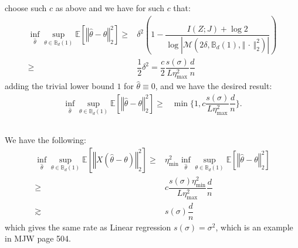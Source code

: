 \documentclass[11pt,a4paper]{ctexart}
\numberwithin{equation}{section}%
\begin{document}
    choose such $ c $ as above and we have for such $ c $ that:
    \begin{align*}
        \mathop{ \inf }\limits_{\hat{\theta }}\mathop{ \sup }\limits_{\theta \in \mathbb{B}_d(1)} \mathbb{E}\left[ \left\Vert \hat{\theta }-\theta  \right\Vert _2^2 \right] \geq & \delta ^2\left(1-\dfrac{ I(Z;J)+\log 2 }{ \log \left\vert \mathcal{M}(2\delta ,\mathbb{B}_d(1), \left\Vert \, \cdot \,  \right\Vert _2^2 ) \right\vert  }  \right)\\
        \geq & \dfrac{ 1 }{ 2 }\delta ^2 = \dfrac{ c }{ 2 }\dfrac{ s(\sigma ) }{ L\eta_{\max}^2 }\dfrac{ d }{ n } 
    \end{align*}
    adding the trivial lower bound $ 1 $ for $ \hat{\theta }\equiv 0 $, and we have the desired result:
    \begin{align*}
        \mathop{ \inf }\limits_{\hat{\theta }}\mathop{ \sup }\limits_{\theta \in \mathbb{B}_d(1)} \mathbb{E}\left[ \left\Vert \hat{\theta }-\theta  \right\Vert _2^2 \right] \geq & \min \big\{ 1, c\dfrac{ s(\sigma ) }{ L\eta_{\max}^2 }\dfrac{ d }{ n }  \big\}.
    \end{align*}


\subsection{}

We have the following:
\begin{align*}
    \mathop{ \inf }\limits_{\hat{\theta }}\mathop{ \sup }\limits_{\theta \in \mathbb{B}_d(1)}\mathbb{E}\left[ \left\Vert X(\hat{\theta }-\theta)  \right\Vert _2^2 \right] \geq & \eta_{\min}^2\mathop{ \inf }\limits_{\hat{\theta }}\mathop{ \sup }\limits_{\theta \in \mathbb{B}_d(1)} \mathbb{E}\left[ \left\Vert \hat{\theta }-\theta  \right\Vert _2^2 \right] \\
    \geq& c\dfrac{ s(\sigma )\eta_{\min}^2 }{ L\eta_{\max}^2 }\dfrac{ d }{ n } \\
    \gtrsim &s(\sigma )\dfrac{ d }{ n } 
\end{align*}
which gives the same rate as Linear regression $ s(\sigma )=\sigma ^2 $, which is an example in MJW page 504.


    
    
    
       
\end{document}
